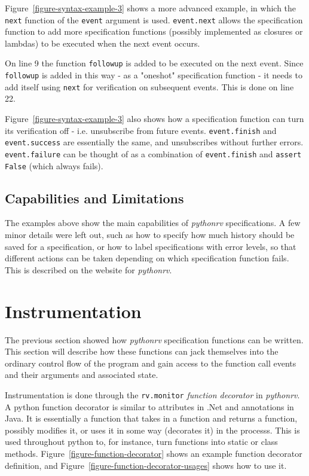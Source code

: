 \documentclass[a4paper,11pt]{kth-mag}
\begin{document}
Figure~\ref{figure-syntax-example-3} shows a more advanced example, in which
the \texttt{next} function of the \texttt{event} argument is used.
\texttt{event.next} allows the specification function to add more specification
functions (possibly implemented as closures or lambdas) to be executed when the
next event occurs.

On line 9 the function \texttt{followup} is added to be executed on the next
event. Since \texttt{followup} is added in this way - as a "oneshot"
specification function - it needs to add itself using \texttt{next} for
verification on subsequent events. This is done on line 22.

Figure~\ref{figure-syntax-example-3} also shows how a specification function
can turn its verification off - i.e. unsubscribe from future events.
\texttt{event.finish} and \texttt{event.success} are essentially the same, and
unsubscribes without further errors. \texttt{event.failure} can be thought of
as a combination of \texttt{event.finish} and \texttt{assert False} (which
always fails).


\subsection{Capabilities and Limitations}

The examples above show the main capabilities of \textit{pythonrv}
specifications. A few minor details were left out, such as how to specify how
much history should be saved for a specification, or how to label
specifications with error levels, so that different actions can be taken
depending on which specification function fails. This is described on the website for
\textit{pythonrv}.


\section{Instrumentation} \label{section-approach-instrumentation}

The previous section showed how \textit{pythonrv} specification functions can
be written. This section will describe how these functions can jack themselves
into the ordinary control flow of the program and gain access to the function
call events and their arguments and associated state.

Instrumentation is done through the \texttt{rv.monitor} \textit{function
decorator} in \textit{pythonrv}. A python function decorator is similar to
attributes in .Net and annotations in Java. It is essentially a function that
takes in a function and returns a function, possibly modifies it, or uses it in
some way (decorates it) in the processs. This is used throughout python to, for
instance, turn functions into static or class methods.
Figure~\ref{figure-function-decorator} shows an example function decorator
definition, and Figure~\ref{figure-function-decorator-usages} shows how to use
it.
\end{document}
